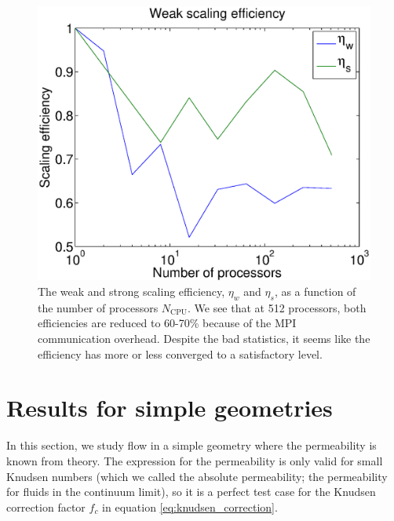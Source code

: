 \begin{figure}[H]
\begin{center}
\includegraphics[width=\textwidth, trim=0cm 0cm 0cm 0cm, clip]{DSMC/figures/scaling.eps}
\end{center}
\caption{The weak and strong scaling efficiency, $\eta_w$ and $\eta_s$, as a function of the number of processors $N_\text{CPU}$. We see that at 512 processors, both efficiencies are reduced to 60-70\% because of the MPI communication overhead. Despite the bad statistics, it seems like the efficiency has more or less converged to a satisfactory level.}
\label{fig:dsmc_scaling}
\end{figure}

\section{Results for simple geometries}
\label{sec:results_for_simple_geometries}
In this section, we study flow in a simple geometry where the permeability is known from theory. The expression for the permeability is only valid for small Knudsen numbers (which we called the absolute permeability; the permeability for fluids in the continuum limit), so it is a perfect test case for the Knudsen correction factor $f_c$ in equation \eqref{eq:knudsen_correction}. 

